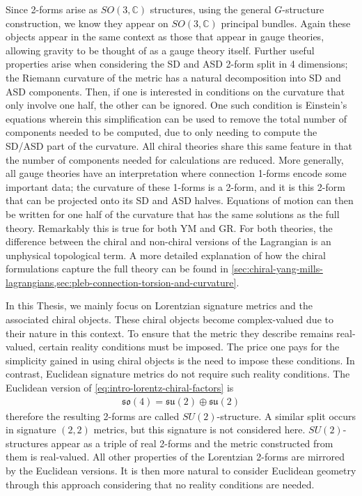 \documentclass[10pt]{report}
\theoremstyle{definition}
\newcommand{\C}[0]{\mathbb{C}}
\newcommand{\so}{\mathfrak{so}}
\newcommand{\su}{\mathfrak{su}}
\begin{document}
Since 2-forms arise as $SO(3,\C)$ structures, using the general $G$-structure construction, we know they appear on $SO(3,\C)$ principal bundles. Again these objects appear in the same context as those that appear in gauge theories, allowing gravity to be thought of as a gauge theory itself. Further useful properties arise when considering the SD and ASD 2-form split in 4 dimensions; the Riemann curvature of the metric has a natural decomposition into SD and ASD components. Then, if one is interested in conditions on the curvature that only involve one half, the other can be ignored. One such condition is Einstein's equations wherein this simplification can be used to remove the total number of components needed to be computed, due to only needing to compute the SD/ASD part of the curvature. All chiral theories share this same feature in that the number of components needed for calculations are reduced. More generally, all gauge theories have an interpretation where connection 1-forms encode some important data; the curvature of these 1-forms is a 2-form, and it is this 2-form that can be projected onto its SD and ASD halves. Equations of motion can then be written for one half of the curvature that has the same solutions as the full theory. Remarkably this is true for both YM and GR. For both theories, the difference between the chiral and non-chiral versions of the Lagrangian is an unphysical topological term. A more detailed explanation of how the chiral formulations capture the full theory can be found in \cref{sec:chiral-yang-mills-lagrangians,sec:pleb-connection-torsion-and-curvature}.

In this Thesis, we mainly focus on Lorentzian signature metrics and the associated chiral objects. These chiral objects become complex-valued due to their nature in this context. To ensure that the metric they describe remains real-valued, certain reality conditions must be imposed. The price one pays for the simplicity gained in using chiral objects is the need to impose these conditions. In contrast, Euclidean signature metrics do not require such reality conditions. The Euclidean version of \cref{eq:intro-lorentz-chiral-factors} is 
\begin{align}
	\so(4) = \su(2) \oplus \su(2)
\end{align}
therefore the resulting 2-forms are called $SU(2)$-structure. A similar split occurs in signature $(2,2)$ metrics, but this signature is not considered here. $SU(2)$-structures appear as a triple of real 2-forms and the metric constructed from them is real-valued. All other properties of the Lorentzian 2-forms are mirrored by the Euclidean versions. It is then more natural to consider Euclidean geometry through this approach considering that no reality conditions are needed.
\end{document}
